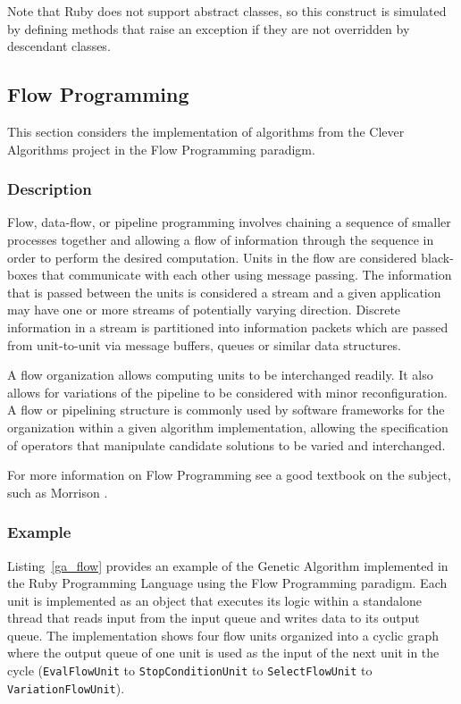 Note that Ruby does not support abstract classes, so this construct is simulated by defining methods that raise an exception if they are not overridden by descendant classes.




% 
% 
\subsection{Flow Programming}
\label{sec:flow}
This section considers the implementation of algorithms from the Clever Algorithms project in the Flow Programming paradigm.

\subsubsection{Description}
Flow, data-flow, or pipeline programming involves chaining a sequence of smaller processes together and allowing a flow of information through the sequence in order to perform the desired computation. Units in the flow are considered black-boxes that communicate with each other using message passing. The information that is passed between the units is considered a stream and a given application may have one or more streams of potentially varying direction. Discrete information in a stream is partitioned into information packets which are passed from unit-to-unit via message buffers, queues or similar data structures.

A flow organization allows computing units to be interchanged readily. It also allows for variations of the pipeline to be considered with minor reconfiguration. A flow or pipelining structure is commonly used by software frameworks for the organization within a given algorithm implementation, allowing the specification of operators that manipulate candidate solutions to be varied and interchanged.

For more information on Flow Programming see a good textbook on the subject, such as Morrison \cite{Morrison2010}.

\subsubsection{Example}
Listing~\ref{ga_flow} provides an example of the Genetic Algorithm implemented in the Ruby Programming Language using the Flow Programming paradigm.
Each unit is implemented as an object that executes its logic within a standalone thread that reads input from the input queue and writes data to its output queue. The implementation shows four flow units organized into a cyclic graph where the output queue of one unit is used as the input of the next unit in the cycle (\texttt{EvalFlowUnit} to \texttt{StopConditionUnit} to \texttt{SelectFlowUnit} to \texttt{VariationFlowUnit}). 


